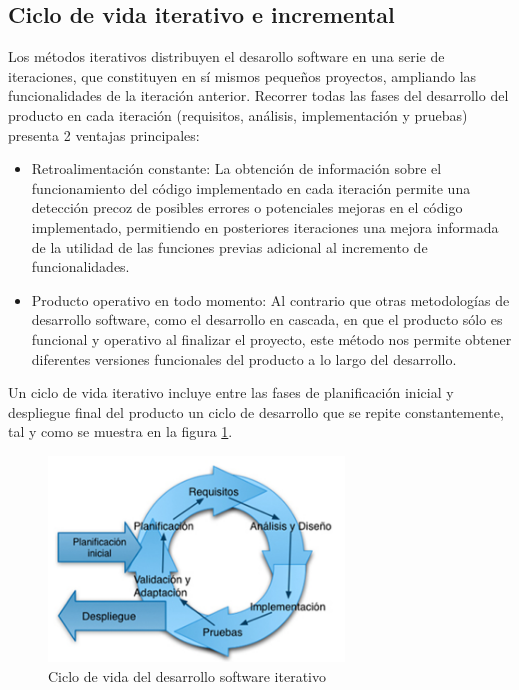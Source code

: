 \subsection{Ciclo de vida iterativo e incremental}
Los métodos iterativos distribuyen el desarollo software en una serie de iteraciones, que constituyen en sí mismos pequeños proyectos, ampliando las funcionalidades de la iteración anterior. Recorrer todas las fases del desarrollo del producto en cada iteración (requisitos, análisis, implementación y pruebas) presenta 2 ventajas principales\cite{Pradel2013}:
\begin{itemize}
    \item Retroalimentación constante: La obtención de información sobre el funcionamiento del código implementado en cada iteración permite una detección precoz de posibles errores o potenciales mejoras en el código implementado, permitiendo en posteriores iteraciones una mejora informada de la utilidad de las funciones previas adicional al incremento de funcionalidades.
    \item Producto operativo en todo momento: Al contrario que otras metodologías de desarrollo software, como el desarrollo en cascada, en que el producto sólo es funcional y operativo al finalizar el proyecto, este método nos permite obtener diferentes versiones funcionales del producto a lo largo del desarrollo.
\end{itemize}
Un ciclo de vida iterativo incluye entre las fases de planificación inicial y despliegue final del producto un ciclo de desarrollo que se repite constantemente, tal y como se muestra en la figura \ref{fig:iterativoincremental}.
\begin{figure}[h]
    \centering
    \includegraphics[width=0.7\textwidth]{img/Iterativoincremental.png}
    \caption{Ciclo de vida del desarrollo software iterativo \cite{Pradel2013} }
    \label{fig:iterativoincremental}
\end{figure}
